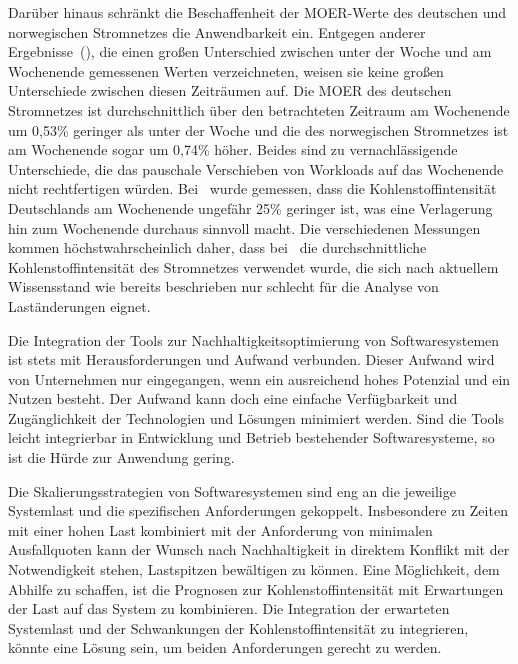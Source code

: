 Darüber hinaus schränkt die Beschaffenheit der \ac{MOER}-Werte des deutschen und norwegischen Stromnetzes die Anwendbarkeit ein.
Entgegen anderer Ergebnisse~(\cite{Wiesner.2021}), die einen großen Unterschied zwischen unter der Woche und am Wochenende gemessenen Werten verzeichneten, weisen sie keine großen Unterschiede zwischen diesen Zeiträumen auf.
Die \ac{MOER} des deutschen Stromnetzes ist durchschnittlich über den betrachteten Zeitraum am Wochenende um 0,53\% geringer als unter der Woche und die des norwegischen Stromnetzes ist am Wochenende sogar um 0,74\% höher.
Beides sind zu vernachlässigende Unterschiede, die das pauschale Verschieben von Workloads auf das Wochenende nicht rechtfertigen würden.
Bei~\cite{Wiesner.2021} wurde gemessen, dass die Kohlenstoffintensität Deutschlands am Wochenende ungefähr 25\% geringer ist, was eine Verlagerung hin zum Wochenende durchaus sinnvoll macht.
Die verschiedenen Messungen kommen höchstwahrscheinlich daher, dass bei~\cite{Wiesner.2021} die durchschnittliche Kohlenstoffintensität des Stromnetzes verwendet wurde, die sich nach aktuellem Wissensstand wie bereits beschrieben nur schlecht für die Analyse von Laständerungen eignet.

Die Integration der Tools zur Nachhaltigkeitsoptimierung von Softwaresystemen ist stets mit Herausforderungen und Aufwand verbunden.
Dieser Aufwand wird von Unternehmen nur eingegangen, wenn ein ausreichend hohes Potenzial und ein Nutzen besteht.
Der Aufwand kann doch eine einfache Verfügbarkeit und Zugänglichkeit der Technologien und Lösungen minimiert werden.
Sind die Tools leicht integrierbar in Entwicklung und Betrieb bestehender Softwaresysteme, so ist die Hürde zur Anwendung gering.

Die Skalierungsstrategien von Softwaresystemen sind eng an die jeweilige Systemlast und die spezifischen Anforderungen gekoppelt.
Insbesondere zu Zeiten mit einer hohen Last kombiniert mit der Anforderung von minimalen Ausfallquoten kann der Wunsch nach Nachhaltigkeit in direktem Konflikt mit der Notwendigkeit stehen, Lastspitzen bewältigen zu können.
Eine Möglichkeit, dem Abhilfe zu schaffen, ist die Prognosen zur Kohlenstoffintensität mit Erwartungen der Last auf das System zu kombinieren.
Die Integration der erwarteten Systemlast und der Schwankungen der Kohlenstoffintensität zu integrieren, könnte eine Lösung sein, um beiden Anforderungen gerecht zu werden.



